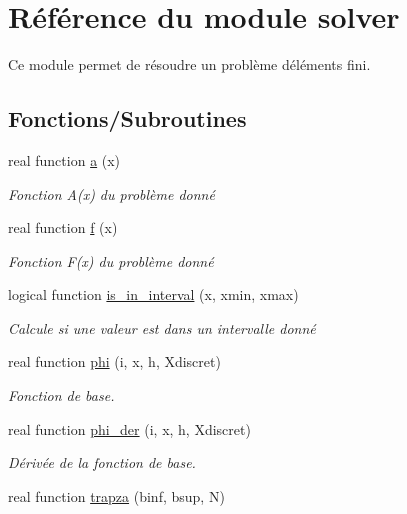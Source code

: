 \hypertarget{namespacesolver}{}\section{Référence du module solver}
\label{namespacesolver}


Ce module permet de résoudre un problème d\textquotesingle{}éléments fini.  


\subsection*{Fonctions/\+Subroutines}
\begin{DoxyCompactItemize}
\item 
real function \hyperlink{namespacesolver_ab0081bb7880652eb26e65994f13fcb54}{a} (x)
\begin{DoxyCompactList}\small\item\em Fonction A(x) du problème donné \end{DoxyCompactList}\item 
real function \hyperlink{namespacesolver_a6f4d43c88c7c8ebdea64bd45e002af05}{f} (x)
\begin{DoxyCompactList}\small\item\em Fonction F(x) du problème donné \end{DoxyCompactList}\item 
logical function \hyperlink{namespacesolver_a2380e35eaa6fcef040f90bb5b23baa6a}{is\+\_\+in\+\_\+interval} (x, xmin, xmax)
\begin{DoxyCompactList}\small\item\em Calcule si une valeur est dans un intervalle donné \end{DoxyCompactList}\item 
real function \hyperlink{namespacesolver_a3323b7ad7f72685a465733177c82e8cc}{phi} (i, x, h, Xdiscret)
\begin{DoxyCompactList}\small\item\em Fonction de base. \end{DoxyCompactList}\item 
real function \hyperlink{namespacesolver_add1e5803b09e373fde46731960030e42}{phi\+\_\+der} (i, x, h, Xdiscret)
\begin{DoxyCompactList}\small\item\em Dérivée de la fonction de base. \end{DoxyCompactList}\item 
real function \hyperlink{namespacesolver_a5cdc774a6979796cb6b072b2fbb0e5af}{trapza} (binf, bsup, N)

\end{DoxyCompactItemize}
